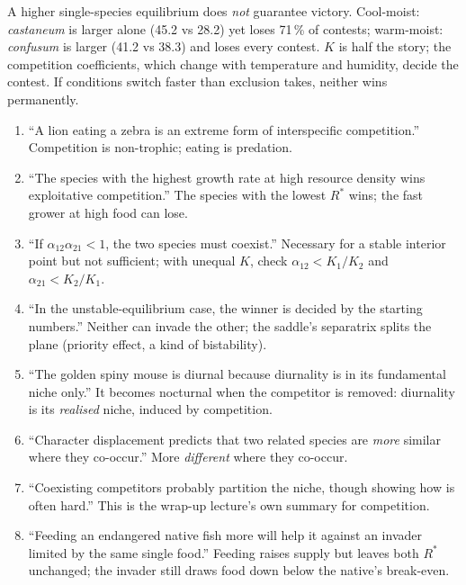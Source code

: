 \begin{keyidea}
A higher single-species equilibrium does \emph{not} guarantee victory. Cool-moist: \emph{castaneum} is larger alone
(45.2 vs 28.2) yet loses 71\,\% of contests; warm-moist: \emph{confusum} is larger (41.2 vs 38.3) and loses every
contest. $K$ is half the story; the competition coefficients, which change with temperature and humidity, decide the
contest. If conditions switch faster than exclusion takes, neither wins permanently.
\end{keyidea}

\begin{statements}
\begin{enumerate}[label=\arabic*.]
\item ``A lion eating a zebra is an extreme form of interspecific competition.''
\F Competition is non-trophic; eating is predation.
\item ``The species with the highest growth rate at high resource density wins exploitative competition.''
\F The species with the lowest $R^*$ wins; the fast grower at high food can lose.
\item ``If $\alpha_{12}\alpha_{21}<1$, the two species must coexist.''
\F Necessary for a stable interior point but not sufficient; with unequal $K$, check $\alpha_{12}<K_1/K_2$ and $\alpha_{21}<K_2/K_1$.
\item ``In the unstable-equilibrium case, the winner is decided by the starting numbers.''
\T Neither can invade the other; the saddle's separatrix splits the plane (priority effect, a kind of bistability).
\item ``The golden spiny mouse is diurnal because diurnality is in its fundamental niche only.''
\F It becomes nocturnal when the competitor is removed: diurnality is its \emph{realised} niche, induced by competition.
\item ``Character displacement predicts that two related species are \emph{more} similar where they co-occur.''
\F More \emph{different} where they co-occur.
\item ``Coexisting competitors probably partition the niche, though showing how is often hard.''
\T This is the wrap-up lecture's own summary for competition.
\item ``Feeding an endangered native fish more will help it against an invader limited by the same single food.''
\F Feeding raises supply but leaves both $R^*$ unchanged; the invader still draws food down below the native's break-even.
\end{enumerate}
\end{statements}

